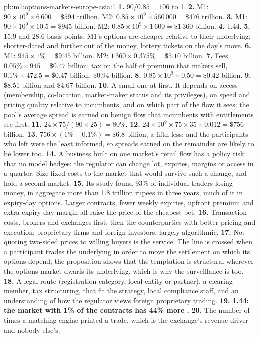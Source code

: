\begin{solution}{pb:m1:options-markets-europe-asia:1}
\textbf{1.} $90/0.85 = 106$ to 1.
\textbf{2.} M1: $90 \times 10^9 \times 6\,600 = \$594$ trillion. M2: $0.85 \times
10^9 \times 560\,000 = \$476$ trillion.
\textbf{3.} M1: $90 \times 10^9 \times 10.5 = \$945$ billion. M2: $0.85 \times 10^9
\times 1\,600 = \$1\,360$ billion.
\textbf{4.} 1.44.
\textbf{5.} 15.9 and 28.6 basis points. M1's options are cheaper relative to
their underlying: shorter-dated and further out of the money, lottery
tickets on the day's move.
\textbf{6.} M1: $945 \times 1\% = \$9.45$ billion. M2: $1\,360 \times 0.375\% =
\$5.10$ billion.
\textbf{7.} Fees $0.05\% \times 945 = \$0.47$ billion; tax on the half of
premium that makers sell, $0.1\% \times 472.5 = \$0.47$ billion: \$0.94 billion.
\textbf{8.} $0.85 \times 10^9 \times 0.50 = \$0.42$ billion.
\textbf{9.} \$8.51 billion and \$4.67 billion.
\textbf{10.} A small one at first. It depends on access (membership,
co-location, market-maker status and its privileges), on speed and pricing
quality relative to incumbents, and on which part of the flow it sees: the
pool's average spread is earned on benign flow that incumbents with
entitlements see first.
\textbf{11.} $24 \times 75/(90 \times 25) = 80\%$.
\textbf{12.} $24 \times 10^9 \times 75 \times 35 \times 0.012 = \$756$ billion.
\textbf{13.} $756 \times (1\% - 0.1\%) = \$6.8$ billion, a fifth less; and
the participants who left were the least informed, so spreads earned on the
remainder are likely to be lower too.
\textbf{14.} A business built on one market's retail flow has a policy risk
that no model hedges: the regulator can change lot, expiries, margins or
access in a quarter. Size fixed costs to the market that would survive such
a change, and hold a second market.
\textbf{15.} Its study found 93\% of individual traders losing money, in
aggregate more than 1.8 trillion rupees in three years, much of it in
expiry-day options. Larger contracts, fewer weekly expiries, upfront
premium and extra expiry-day margin all raise the price of the cheapest
bet.
\textbf{16.} Transaction costs, brokers and exchanges first; then the
counterparties with better pricing and execution: proprietary firms and
foreign investors, largely algorithmic.
\textbf{17.} No: quoting two-sided prices to willing buyers is the service.
The line is crossed when a participant trades the underlying in order to
move the settlement on which its options depend; the proposition shows that
the temptation is structural wherever the options market dwarfs its
underlying, which is why the surveillance is too.
\textbf{18.} A legal route (registration category, local entity or
partner), a clearing member, tax structuring,  that fit the
strategy, local compliance staff, and an understanding of how the regulator
views foreign proprietary trading.
\textbf{19.} \textbf{1.44: the market with 1\% of the contracts has 44\% more
.}
\textbf{20.} The number of times a matching engine printed a trade, which is
the exchange's revenue driver and nobody else's.
\end{solution}

